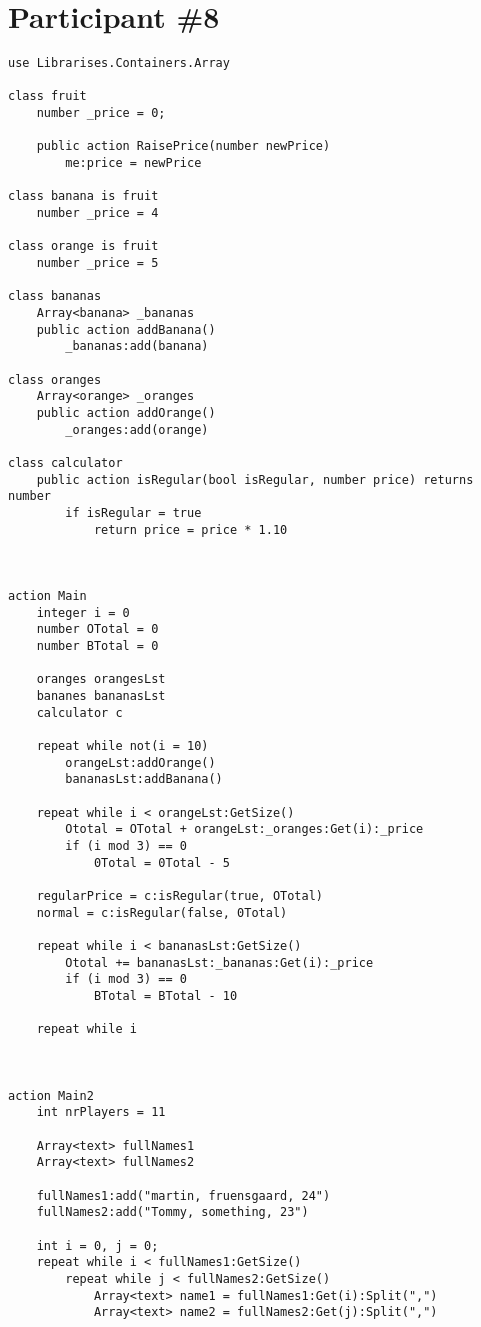 \section{Participant \#8}
\begin{lstlisting}[language=Quorum,tabsize=2]
use Librarises.Containers.Array

class fruit 
	number _price = 0;
	
	public action RaisePrice(number newPrice) 
		me:price = newPrice
		
class banana is fruit 
	number _price = 4
	
class orange is fruit
	number _price = 5 
	
class bananas 
	Array<banana> _bananas
	public action addBanana()
		_bananas:add(banana) 
	
class oranges
	Array<orange> _oranges
	public action addOrange()
		_oranges:add(orange)
	
class calculator
	public action isRegular(bool isRegular, number price) returns number 
		if isRegular = true
			return price = price * 1.10


			
action Main 
	integer i = 0
	number OTotal = 0
	number BTotal = 0 
	
	oranges orangesLst
	bananes bananasLst
	calculator c 
	
	repeat while not(i = 10)
		orangeLst:addOrange()
		bananasLst:addBanana()
		
	repeat while i < orangeLst:GetSize()
		Ototal = OTotal + orangeLst:_oranges:Get(i):_price
		if (i mod 3) == 0
			0Total = 0Total - 5
			
	regularPrice = c:isRegular(true, OTotal)
	normal = c:isRegular(false, 0Total)
		
	repeat while i < bananasLst:GetSize()
		Ototal += bananasLst:_bananas:Get(i):_price
		if (i mod 3) == 0
			BTotal = BTotal - 10
		
	repeat while i  
	
	
	
action Main2
	int nrPlayers = 11
	
	Array<text> fullNames1
	Array<text> fullNames2
	
	fullNames1:add("martin, fruensgaard, 24")
	fullNames2:add("Tommy, something, 23")
	
	int i = 0, j = 0; 
	repeat while i < fullNames1:GetSize()
		repeat while j < fullNames2:GetSize()
			Array<text> name1 = fullNames1:Get(i):Split(",")
			Array<text> name2 = fullNames2:Get(j):Split(",")
			

\end{lstlisting}
